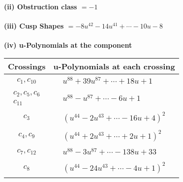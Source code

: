 \documentclass[1p]{elsarticle_modified}
\theoremstyle{definition}
\begin{document}
\flushleft \textbf{(ii) Obstruction class $= -1$}\\~\\
\flushleft \textbf{(iii) Cusp Shapes $= -8 u^{42}-14 u^{41}+\cdots-10 u-8$}\\~\\
\newpage\renewcommand{\arraystretch}{1}
\flushleft \textbf{(iv) u-Polynomials at the component}\newline \\
\begin{tabular}{m{50pt}|m{274pt}}
Crossings & \hspace{64pt}u-Polynomials at each crossing \\
\hline $$\begin{aligned}c_{1},c_{10}\end{aligned}$$&$\begin{aligned}
&u^{88}+39 u^{87}+\cdots+18 u+1
\end{aligned}$\\
\hline $$\begin{aligned}c_{2},c_{5},c_{6}\\c_{11}\end{aligned}$$&$\begin{aligned}
&u^{88}- u^{87}+\cdots-6 u+1
\end{aligned}$\\
\hline $$\begin{aligned}c_{3}\end{aligned}$$&$\begin{aligned}
&(u^{44}-2 u^{43}+\cdots-16 u+4)^{2}
\end{aligned}$\\
\hline $$\begin{aligned}c_{4},c_{9}\end{aligned}$$&$\begin{aligned}
&(u^{44}+2 u^{43}+\cdots+2 u+1)^{2}
\end{aligned}$\\
\hline $$\begin{aligned}c_{7},c_{12}\end{aligned}$$&$\begin{aligned}
&u^{88}-3 u^{87}+\cdots-138 u+33
\end{aligned}$\\
\hline $$\begin{aligned}c_{8}\end{aligned}$$&$\begin{aligned}
&(u^{44}-24 u^{43}+\cdots-4 u+1)^{2}
\end{aligned}$\\
\hline
\end{tabular}\\~\\
\end{document}
